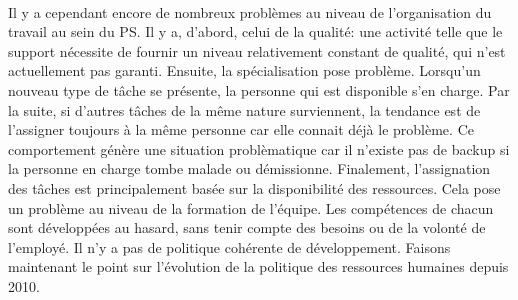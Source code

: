 \paragraph{}Il y a cependant encore de nombreux problèmes au niveau de l'organisation du travail au sein du PS. Il y a, d'abord, celui de la qualité: une activité telle que le support nécessite de fournir un niveau relativement constant de qualité, qui n'est actuellement pas garanti. Ensuite, la spécialisation pose problème. Lorsqu'un nouveau type de tâche se présente, la personne qui est disponible s'en charge. Par la suite, si d'autres tâches de la même nature surviennent, la tendance est de l'assigner toujours à la même personne car elle connait déjà le problème. Ce comportement génère une situation problèmatique car il n'existe pas de backup si la personne en charge tombe malade ou démissionne. 
Finalement, l'assignation des tâches est principalement basée sur la disponibilité des ressources. Cela pose un problème au niveau de la formation de l'équipe. Les compétences de chacun sont développées au hasard, sans tenir compte des besoins ou de la volonté de l'employé. Il n'y a pas de politique cohérente de développement. Faisons maintenant le point sur l'évolution de la politique des ressources humaines depuis 2010. 

